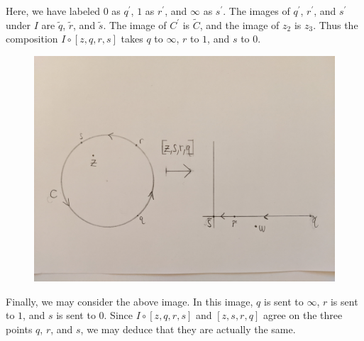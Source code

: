 \documentclass[12pt]{article}
\begin{document}
\noindent Here, we have labeled $0$ as $q^\prime$, $1$ as $r^\prime$, and $\infty$ as $s^\prime$. The images of $q^\prime$, $r^\prime$, and $s^\prime$ under $I$ are $\tilde{q}$, $\tilde{r}$, and $\tilde{s}$. The image of $C^\prime$ is $\tilde{C}$, and the image of $z_2$ is $z_3$. Thus the composition $I\circ[z,q,r,s]$ takes $q$ to $\infty$, $r$ to $1$, and $s$ to $0$.
\begin{figure}[H]
\centering
\includegraphics[width=\textwidth]{Problem16Image3}
\end{figure} 
\noindent Finally, we may consider the above image. In this image, $q$ is sent to $\infty$, $r$ is sent to $1$, and $s$ is sent to $0$. Since $I\circ[z,q,r,s]$ and $[z,s,r,q]$ agree on the three points $q$, $r$, and $s$, we may deduce that they are actually the same.
\end{document}
